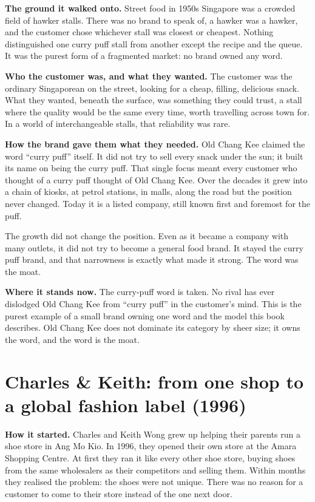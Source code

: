 \documentclass[10pt,twoside,openany]{memoir}
\newcommand{\needspacehead}{\needspace{4\baselineskip}}
\let\oldsection\section
\renewcommand{\section}{\needspacehead\oldsection}
\begin{document}
\textbf{The ground it walked onto.} Street food in 1950s Singapore was a
crowded field of hawker stalls. There was no brand to speak of, a hawker
was a hawker, and the customer chose whichever stall was closest or
cheapest. Nothing distinguished one curry puff stall from another except
the recipe and the queue. It was the purest form of a fragmented market:
no brand owned any word.

\textbf{Who the customer was, and what they wanted.} The customer was
the ordinary Singaporean on the street, looking for a cheap, filling,
delicious snack. What they wanted, beneath the surface, was something
they could trust, a stall where the quality would be the same every
time, worth travelling across town for. In a world of interchangeable
stalls, that reliability was rare.

\textbf{How the brand gave them what they needed.} Old Chang Kee claimed
the word ``curry puff'' itself. It did not try to sell every snack under
the sun; it built its name on being the curry puff. That single focus
meant every customer who thought of a curry puff thought of Old Chang
Kee. Over the decades it grew into a chain of kiosks, at petrol
stations, in malls, along the road but the position never changed. Today
it is a listed company, still known first and foremost for the puff.

The growth did not change the position. Even as it became a company with
many outlets, it did not try to become a general food brand. It stayed
the curry puff brand, and that narrowness is exactly what made it
strong. The word was the moat.

\textbf{Where it stands now.} The curry-puff word is taken. No rival has
ever dislodged Old Chang Kee from ``curry puff'' in the customer's mind.
This is the purest example of a small brand owning one word and the
model this book describes. Old Chang Kee does not dominate its category
by sheer size; it owns the word, and the word is the moat.

\section{Charles \& Keith: from one shop to a global fashion label
(1996)}\label{charles-keith-from-one-shop-to-a-global-fashion-label-1996}

\textbf{How it started.} Charles and Keith Wong grew up helping their
parents run a shoe store in Ang Mo Kio. In 1996, they opened their own
store at the Amara Shopping Centre. At first they ran it like every
other shoe store, buying shoes from the same wholesalers as their
competitors and selling them. Within months they realised the problem:
the shoes were not unique. There was no reason for a customer to come to
their store instead of the one next door.
\end{document}

